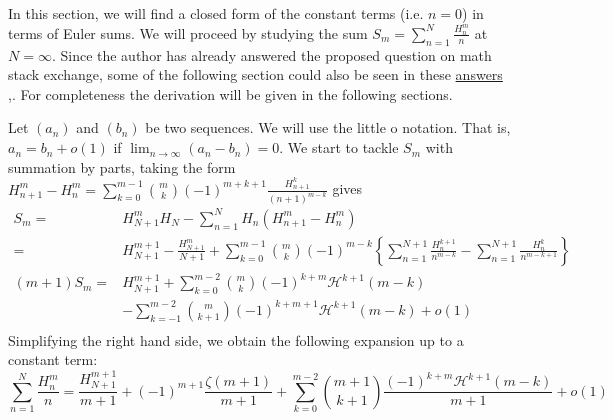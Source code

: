 \documentclass{article}
\newcommand{\pHz}[2]{\mathcal{H}^{#1}(#2)}
\begin{document}
In this section, we will find a closed form of the constant terms (i.e. $n=0$) in terms of Euler sums. We will proceed by studying the sum $\displaystyle S_m=\sum_{n=1}^N \frac{H_n^m}{n}$ at $N=\infty$. Since the author has already answered the proposed question on math stack exchange, some of the following section could also be seen in these \href{https://math.stackexchange.com/questions/2582497/a-closed-form-of-the-family-of-series-sum-k-1-infty-frac-lefth-k-rig/4956908#4956908}{answers} \cite{4956908},\cite{4972514}. For completeness the derivation will be given in the following sections.

Let $(a_n)$ and $(b_n)$ be two sequences. We will use the little o notation. That is, $a_n=b_n+o(1)$ if $\lim_{n\to\infty}(a_n-b_n)=0$. We start to tackle $S_m$ with summation by parts, taking the form $H_{n+1}^m-H_n^m=\sum_{k=0}^{m-1} \binom{m}{k} (-1)^{m+k+1}\frac{H^k_{n+1}}{(n+1)^{m-k}}$ gives
\begin{align*}S_m=& H_{N+1}^{m}H_N-\sum_{n=1}^N H_n (H_{n+1}^m-H_n^m) \\ 
=& H_{N+1}^{m+1}-\frac{H^m_{N+1}}{N+1}+\sum_{k=0}^{m-1}\binom{m}{k}(-1)^{m-k}\left\{\sum_{n=1}^{N+1} \frac{H_n^{k+1}}{n^{m-k}}-\sum_{n=1}^{N+1} \frac{H_n^k}{n^{m-k+1}}\right\} \\ 
(m+1)S_m = & H_{N+1}^{m+1}+\sum_{k=0}^{m-2} \binom{m}{k}(-1)^{k+m}\pHz{k+1}{m-k}\\ &-\sum_{k=-1}^{m-2}\binom{m}{k+1}(-1)^{k+m+1}\pHz{k+1}{m-k}+o(1) \\
\end{align*}
  Simplifying the right hand side, we obtain the following expansion up to a constant term:
\begin{equation}\label{asymptotic of a harmonic sum}
  \sum_{n=1}^N \frac{H_n^{m }}{n}= \frac{H_{N+1}^{m+1}}{m+1}+(-1)^{m+1}\frac{\zeta(m+1)}{m+1}+\sum_{k=0}^{m-2} \binom{m+1}{k+1} \frac{(-1)^{k+m} \mathcal{H}^{k+1}{(m-k)}}{m+1}+o(1)
\end{equation}
\end{document}
